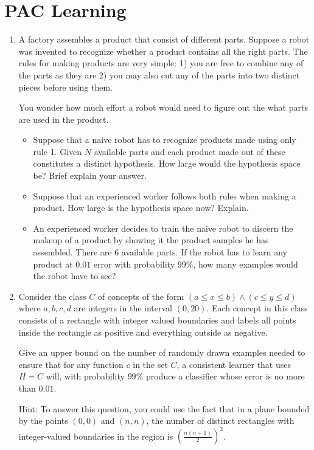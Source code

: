 \section{PAC Learning}
\label{sec:pac-learning}

\begin{enumerate}
\item A factory assembles a product that consist of different
  parts. Suppose a robot was invented to recognize whether a product
  contains all the right parts. The rules for making products are
  very simple: 1) you are free to combine any of the parts as they
  are 2) you may also cut any of the parts into two distinct pieces
  before using them.

  You wonder how much effort a robot would need to figure out the
  what parts are used in the product.

  \begin{itemize}
  \item\relax [5 points] Suppose that a naive robot has to recognize
    products made using only rule 1. Given $N$ available parts and
    each product made out of these constitutes a distinct
    hypothesis. How large would the hypothesis space be? Brief
    explain your answer.
  
  \item\relax [5 points] Suppose that an experienced worker follows
    both rules when making a product. How large is the hypothesis
    space now?  Explain.

  \item\relax [10 points] An experienced worker decides to train the
    naive robot to discern the makeup of a product by showing it the
    product samples he has assembled. There are 6 available
    parts. If the robot has to learn any product at $0.01$ error
    with probability $99\%$, how many examples would the robot have
    to see?
  \end{itemize}


  
\item \relax[20 points] Consider the class $C$ of concepts of the
  form $(a\leq x \leq b) \land (c \leq y \leq d)$ where $a,b,c,d$
  are integers in the interval $(0,20)$. Each concept in this class
  consists of a rectangle with integer valued boundaries and labels
  all points inside the rectangle as positive and everything outside
  as negative.

  Give an upper bound on the number of randomly drawn examples
  needed to ensure that for any function $c$ in the set $C$, a
  consistent learner that uses $H = C$ will, with probability $99\%$
  produce a classifier whose error is no more than $0.01$.

  Hint: To answer this question, you could use the fact that in a
  plane bounded by the points $(0,0)$ and $(n, n)$, the number of
  distinct rectangles with integer-valued boundaries in the region
  is $\left(\frac{n(n+1)}{2}\right)^2$.
  
\end{enumerate}



